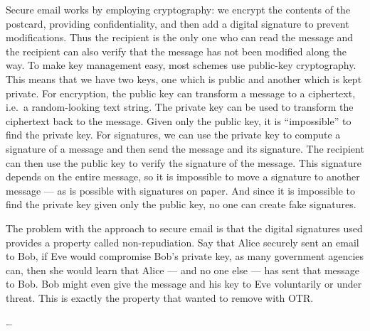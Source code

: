 Secure email works by employing cryptography: we encrypt the contents of the 
postcard, providing confidentiality, and then add a digital signature to 
prevent modifications.
Thus the recipient is the only one who can read the message and the recipient 
can also verify that the message has not been modified along the way.
To make key management easy, most schemes use public-key cryptography.
This means that we have two keys, one which is public and another which is kept
private.
For encryption, the public key can transform a message to a ciphertext, i.e.\ 
a random-looking text string.
The private key can be used to transform the ciphertext back to the message.
Given only the public key, it is \enquote{impossible} to find the private key.
For signatures, we can use the private key to compute a signature of a message 
and then send the message and its signature.
The recipient can then use the public key to verify the signature of the 
message.
This signature depends on the entire message, so it is impossible to move 
a signature to another message --- as is possible with signatures on paper.
And since it is impossible to find the private key given only the public key, 
no one can create fake signatures.

The problem with the approach to secure email is that the digital signatures 
used provides a property called non-repudiation.
Say that Alice securely sent an email to Bob, if Eve would compromise Bob's 
private key, as many government agencies can, then she would learn that Alice 
--- and no one else --- has sent that message to Bob.
Bob might even give the message and his key to Eve voluntarily or under threat.
This is exactly the property that \citeauthor{otr2004} wanted to remove with 
\ac{OTR}.

\citet{OTPKX} \dots
